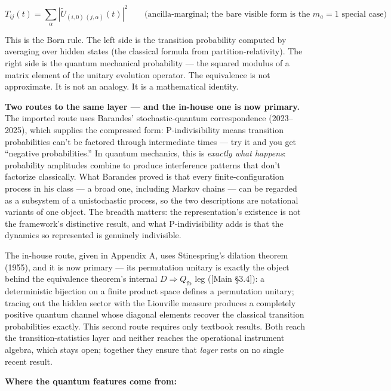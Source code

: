 \documentclass[
]{article}
\begin{document}
\[T_{ij}(t) = \sum_\alpha |\tilde U_{(i,0)\,(j,\alpha)}(t)|^2 \qquad \text{(ancilla-marginal; the bare visible form is the } m_a = 1 \text{ special case)}\]

This is the Born rule. The left side is the transition probability
computed by averaging over hidden states (the classical formula from
partition-relativity). The right side is the quantum mechanical
probability --- the squared modulus of a matrix element of the unitary
evolution operator. The equivalence is not approximate. It is not an
analogy. It is a mathematical identity.

\textbf{Two routes to the same layer --- and the in-house one is now
primary.} The imported route uses Barandes' stochastic-quantum
correspondence (2023--2025), which supplies the compressed form:
P-indivisibility means transition probabilities can't be factored
through intermediate times --- try it and you get ``negative
probabilities.'' In quantum mechanics, this is \emph{exactly what
happens}: probability amplitudes combine to produce interference
patterns that don't factorize classically. What Barandes proved is that
every finite-configuration process in his class --- a broad one,
including Markov chains --- can be regarded as a subsystem of a
unistochastic process, so the two descriptions are notational variants
of one object. The breadth matters: the representation's existence is
not the framework's distinctive result, and what P-indivisibility adds
is that the dynamics so represented is genuinely indivisible.

The in-house route, given in Appendix A, uses Stinespring's dilation
theorem (1955), and it is now primary --- its permutation unitary is
exactly the object behind the equivalence theorem's internal
\(D \Rightarrow Q_{\mathrm{fb}}\) leg ({[}Main §3.4{]}): a deterministic
bijection on a finite product space defines a permutation unitary;
tracing out the hidden sector with the Liouville measure produces a
completely positive quantum channel whose diagonal elements recover the
classical transition probabilities exactly. This second route requires
only textbook results. Both reach the transition-statistics layer and
neither reaches the operational instrument algebra, which stays open;
together they ensure that \emph{layer} rests on no single recent result.

\textbf{Where the quantum features come from:}
\end{document}

